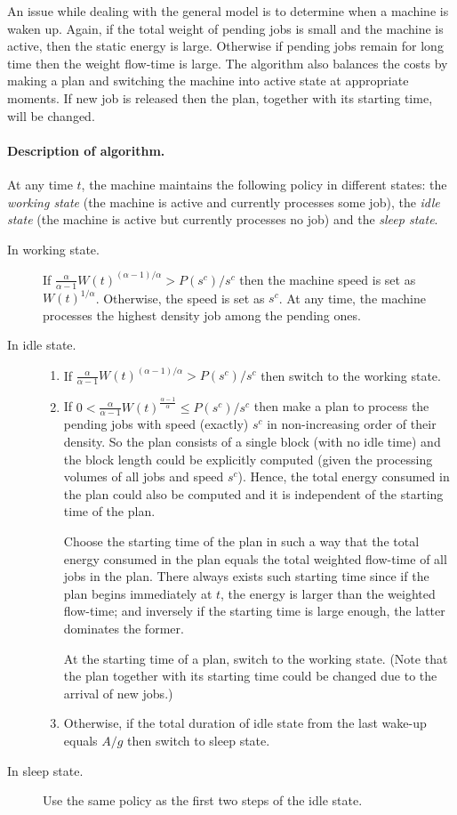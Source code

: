 \documentclass[11pt]{article}
\begin{document}
An issue while dealing with the general model is to determine when a machine is waken up.
Again, if the total weight of pending jobs is small and the machine is active,
then the static energy is large. Otherwise if pending jobs remain for long time then the 
weight flow-time is large. The algorithm also balances the costs by making a plan and 
switching the machine into active state at appropriate moments. 
If new job is released then the plan, together with its starting time, will be changed.  

\paragraph{Description of algorithm.}
At any time $t$, the machine maintains the following policy
in different states: the \emph{working state} (the machine is active and currently processes
some job), the \emph{idle state} (the machine is active but currently processes no job) and 
the \emph{sleep state}.

\begin{description}
\item[In working state.] If $\frac{\alpha}{\alpha-1}W(t)^{(\alpha-1)/\alpha} > P(s^{c})/s^{c}$
		then the machine speed is set as $ W(t)^{1/\alpha}$.
		Otherwise, the speed is set as $ s^{c}$.
		At any time, the machine processes the highest  density job
		among the pending ones. 
\item[In idle state.]
		\begin{enumerate}
			\item If $\frac{\alpha}{\alpha-1}W(t)^{(\alpha-1)/\alpha} > P(s^{c})/s^{c}$
			then switch to the working state.
\item If $0 < \frac{\alpha}{\alpha-1}W(t)^{\frac{\alpha-1}{\alpha}} \leq P(s^{c})/s^{c}$
			then make a plan to process the pending jobs with speed (exactly) $s^{c}$
			in non-increasing order of their  density. So the plan consists of a single 
			block (with no idle time) and the block length could be explicitly computed (given 
			the processing volumes of all jobs and speed $ s^{c}$). Hence, the total energy consumed in the plan 
			could also be computed and it is independent of the starting time of the plan. 
		
			Choose the starting time of the plan in such a way that the total energy consumed 
			in the plan equals the total weighted flow-time of all jobs in the plan. 
			There always exists
			such starting time since if the plan begins immediately at $t$, the energy is larger than  
			the weighted flow-time; 
			and inversely if the starting time is large enough, the latter dominates the former.  
		
			At the starting time of a plan, switch to the working state. (Note that the plan together with 
			its starting time could be changed due to the arrival of new jobs.)
\item Otherwise, if the total duration of idle state from the last wake-up equals
				$A/g$ then switch to sleep state.
		\end{enumerate}
\item[In sleep state.] Use the same policy as
		the first two steps of the idle state.   
\end{description}
  
\end{document}
